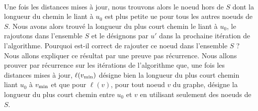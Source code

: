 \paragraph{}

Une fois les distances mises à jour, nous trouvons alors le noeud hors de $S$ dont la longueur du chemin le liant à $u_0$ est plus petite ue pour tous les autres noeuds de $S$.
Nous avons alors trouvé la longueur du plus court chemin le liant à $u_0$, le rajoutons dans l'ensemble $S$ et le désignons par $u'$ dans la prochaine itération de l'algorithme.
Pourquoi est-il correct de rajouter ce noeud dans l'ensemble $S$ ? Nous allons expliquer ce résultat par une preuve pas récurrence.
Nous allons prouver par récurrence sur les itérations de l'algorithme que, une fois les distances mises à jour, $\ell(v_\mathrm{min})$ désigne bien la longueur du plus court chemin liant $u_0$ à $v_\mathrm{min}$ et que pour $\ell(v)$, pour tout noeud $v$ du graphe, désigne la longueur du plus court chemin entre $u_0$ et $v$ en utilisant seulement des noeuds de $S$.

\paragraph{}

